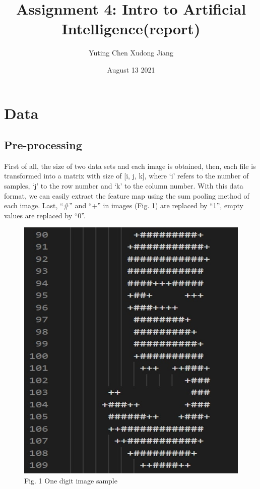 \documentclass{article}
\title{Assignment 4: Intro to Artificial Intelligence(report)}
\author{Yuting Chen Xudong Jiang }
\date{August 13 2021}
\begin{document}
\maketitle

\section{Data}
\subsection{Pre-processing}
First of all, the size of two data sets and each image is obtained, then, each file is transformed into a matrix with size of [i, j, k], where ‘i’ refers to the number of samples, ‘j’ to the row number and ‘k’ to the column number. With this data format, we can easily extract the feature map using the sum pooling method of each image. Last, “\#” and “+” in images (Fig. 1) are replaced by “1”, empty values are replaced by “0”.
 \begin{figure}[h]
  	\center
  	\includegraphics*[scale=0.3]{fig1.jpg}
	\caption{Fig. 1 One digit image sample}
	\label{fig:example}
  \end{figure}
\end{document}
